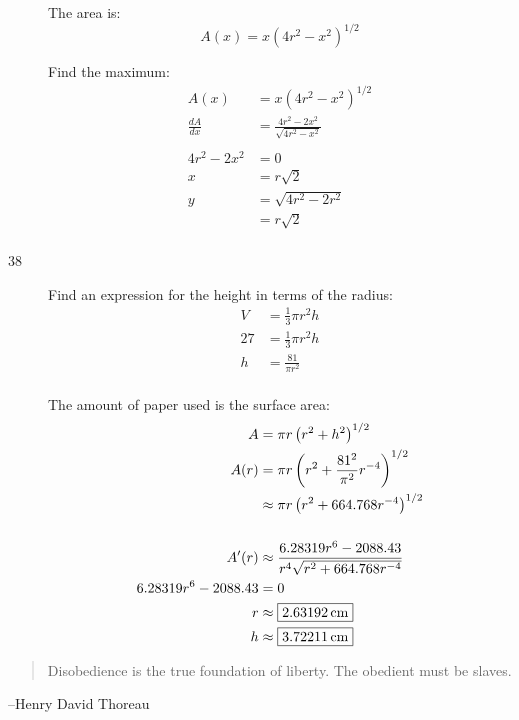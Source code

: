\documentclass[letterpaper]{exam}
\begin{document}
\begin{description}
      The area is:
      \[
        A(x) = x (4r^2 - x^2)^{1/2}
      \]

      Find the maximum:
      \begin{align*}
        A(x)          & = x (4r^2 - x^2)^{1/2} \\
        \frac{dA}{dx} & = \frac{4r^2 - 2x^2}{\sqrt{4r^2 - x^2}} \\
        \\
        4r^2 - 2x^2 & = 0 \\
        x           & = r \sqrt{2} \\
        y           & = \sqrt{4r^2 - 2r^2} \\
                    & = r \sqrt{2} \\
      \end{align*}


    \newpage

    \item[38]
      Find an expression for the height in terms of the radius:
      \begin{align*}
        V  & = \frac{1}{3} \pi r^2 h \\
        27 & = \frac{1}{3} \pi r^2 h \\
        h  & = \frac{81}{\pi r^2} \\
      \end{align*}

      The amount of paper used is the surface area:
      \begin{align*}
        A                     & = \pi r \left( r^2 + h^2 \right)^{1/2} \\
        A(r)                  & = \pi r \left( r^2 + \frac{81^2}{\pi^2} r^{-4} \right)^{1/2} \\
                              & \approx \pi r \left( r^2 + 664.768 r^{-4} \right)^{1/2} \\
        \\
        A'(r)                 & \approx \frac{6.28319 r^6 - 2088.43}{r^4 \sqrt{r^2 + 664.768 r^{ - 4}}} \\
        6.28319 r^6 - 2088.43 & = 0 \\
        r                     & \approx \boxed{ \unit[2.63192]{cm} } \\
        h                     & \approx \boxed{ \unit[3.72211]{cm} } \\
      \end{align*}

  \end{description}

  \else
    \vspace{11 cm}
    \begin{quote}
      \begin{em}
        Disobedience is the true foundation of liberty. The obedient must be slaves. 
      \end{em}
    \end{quote}
    \hspace{2 cm} --Henry David Thoreau
  \fi
\end{document}
